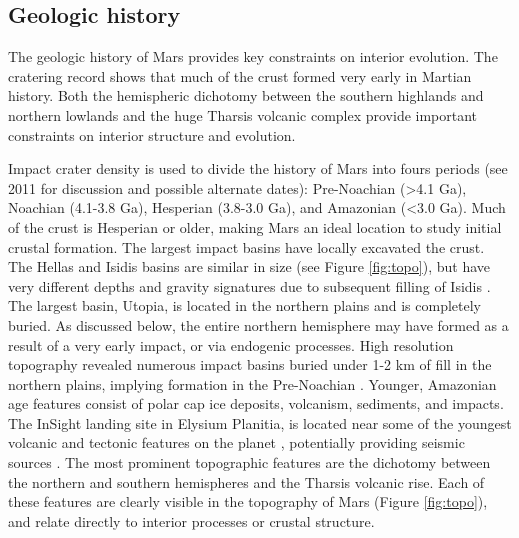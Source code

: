 \subsection{Geologic history}

The geologic history of Mars provides key constraints on interior evolution. The cratering record shows that much of the crust formed very early in Martian history.  Both the hemispheric dichotomy between the southern highlands and northern lowlands and the huge Tharsis volcanic complex provide important constraints on interior structure and evolution. 

Impact crater density is used to divide the history of Mars into fours periods  (see \cite{Werner2011} 2011 for discussion and possible alternate dates): Pre-Noachian (\textgreater 4.1 Ga), Noachian (4.1-3.8 Ga), Hesperian (3.8-3.0 Ga), and Amazonian (\textless 3.0 Ga).  Much of the crust is Hesperian or older, making Mars an ideal location to study initial crustal formation.  The largest impact basins have locally excavated the crust.  The Hellas and Isidis basins are similar in size (see Figure \ref{fig:topo}), but have very different depths and gravity signatures due to subsequent filling of Isidis \citep{Searls2006}. The largest basin, Utopia, is located in the northern plains and is completely buried.  As discussed below, the entire northern hemisphere may have formed as a result of a very early impact, or via endogenic processes. High resolution topography revealed numerous impact basins buried under 1-2 km of fill in the northern plains, implying formation in the Pre-Noachian \citep{Nimmo2005, Frey2006}. Younger, Amazonian age features consist of polar cap ice deposits, volcanism, sediments, and impacts. The InSight landing site in Elysium Planitia, is located near some of the youngest volcanic and tectonic features on the planet \citep{Vaucher2009, Burr2002}, potentially providing seismic sources \citep{Roberts2012, Taylor2013}.
The most prominent topographic features are the dichotomy between the northern and southern hemispheres and the Tharsis volcanic rise. Each of these features are clearly visible in the topography of Mars (Figure \ref{fig:topo}), and relate directly to interior processes or crustal structure.

